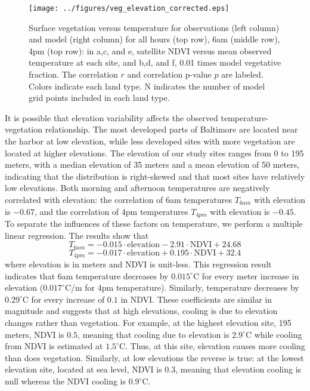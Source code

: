 \documentclass[draft,linenumbers]{agujournal}
\begin{document}
\begin{figure}
\centering
\texttt{[image: ../figures/veg\_elevation\_corrected.eps]}
\caption{Surface vegetation versus temperature for observations (left column) and model (right column) for all hours (top row), 6am (middle row), 4pm (top row): in a,c, and e, satellite NDVI versus mean observed temperature at each site, and b,d, and f, 0.01 times model vegetative fraction. The correlation $r$ and correlation p-value $p$ are labeled. Colors indicate each land type. N indicates the number of model grid points included in each land type.}
\label{fig:veg_elev_corrected}
\end{figure}

It is possible that elevation variability affects the observed  temperature-vegetation relationship. The most developed parts of Baltimore are located near the harbor at low elevation, while less developed sites with more vegetation are located at higher elevations. The elevation of our study sites ranges from 0 to 195 meters, with a median elevation of 35 meters and a mean elevation of 50 meters, indicating that the distribution is right-skewed and that most sites have relatively low elevations. Both morning and afternoon temperatures are negatively correlated with elevation: the correlation of 6am temperatures $T_{6am}$ with elevation is $-0.67$, and the correlation of 4pm temperatures $T_{4pm}$ with elevation is $-0.45$. To separate the influences of these factors on temperature, we perform a multiple linear regression. The results show that 
\[ T_{6am} = -0.015\cdot \text{elevation} -2.91 \cdot \text{NDVI} + 24.68\] 
\[ T_{4pm} = -0.017\cdot \text{elevation} +0.195 \cdot \text{NDVI} + 32.4\]
where elevation is in meters and NDVI is unit-less. 
This regression result indicates that 6am temperature decreases by $0.015^\circ$C for every meter increase in elevation ($0.017^\circ$C/m for 4pm temperature). Similarly, temperature decreases by $0.29^\circ$C for every increase of $0.1$ in NDVI. 
These coefficients are similar in magnitude and suggests that at high elevations, cooling is due to elevation changes rather than vegetation.
 For example, at the highest elevation site, 195 meters, NDVI is $0.5$, meaning that cooling due to elevation is $2.9^\circ$C while cooling from NDVI is estimated at $1.5^\circ$C. Thus, at this site, elevation causes more cooling than does vegetation. 
 Similarly, at low elevations the reverse is true: at the lowest elevation site, located at sea level, NDVI is $0.3$, meaning that elevation cooling is null whereas the NDVI cooling is  $0.9^\circ$C. 
\end{document}
